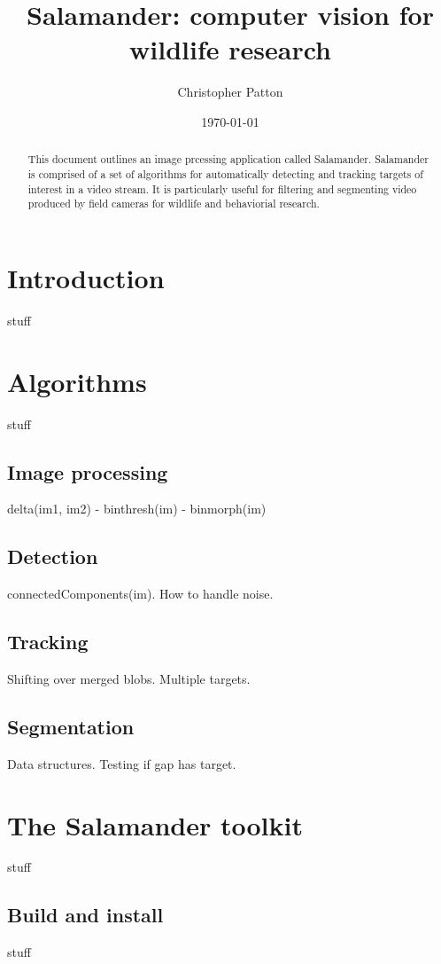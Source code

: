 \documentclass[letter]{article}
\author{Christopher Patton}
\date{\today}
\title{Salamander: computer vision for wildlife research}
\begin{document}
\maketitle

\begin{abstract}
This document outlines an image prcessing application called Salamander. Salamander
is comprised of a set of algorithms for automatically detecting and tracking 
targets of interest in a video stream. It is particularly useful for filtering 
and segmenting video produced by field cameras for wildlife and behaviorial 
research. 
\end{abstract}

\tableofcontents

\section{Introduction}
stuff

\section{Algorithms}
stuff

\subsection{Image processing}
delta(im1, im2) - binthresh(im) - binmorph(im)

\subsection{Detection}
connectedComponents(im). How to handle noise. 

\subsection{Tracking}
Shifting over merged blobs. 
Multiple targets. 

\subsection{Segmentation}
Data structures. 
Testing if gap has target. 
 
\section{The Salamander toolkit}
stuff

\subsection{Build and install} 
stuff
\end{document}
